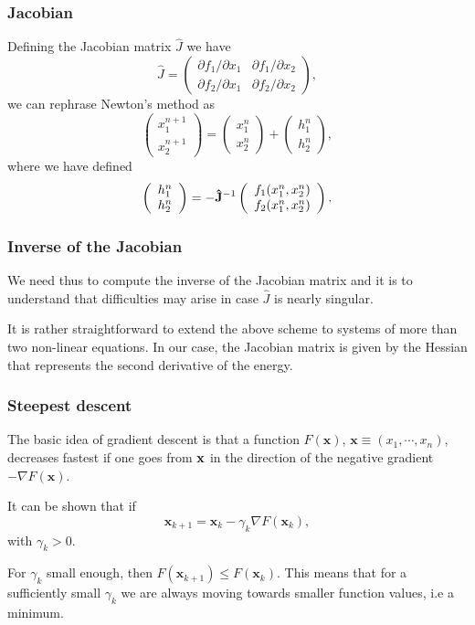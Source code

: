 \documentclass{beamer}
\begin{document}
\begin{frame}
\frametitle{Jacobian}

Defining the Jacobian matrix $\hat{J}$ we have
\[
 \hat{J}=\left( \begin{array}{cc}
                         \partial f_1/\partial x_1  & \partial f_1/\partial x_2 \\
                          \partial f_2/\partial x_1     &\partial f_2/\partial x_2
             \end{array} \right),
\]
we can rephrase Newton's method as
\[
\left(\begin{array}{c} x_1^{n+1} \\ x_2^{n+1} \end{array} \right)=
\left(\begin{array}{c} x_1^{n} \\ x_2^{n} \end{array} \right)+
\left(\begin{array}{c} h_1^{n} \\ h_2^{n} \end{array} \right),
\]
where we have defined
\[
   \left(\begin{array}{c} h_1^{n} \\ h_2^{n} \end{array} \right)=
   -{\bf \hat{J}}^{-1}
   \left(\begin{array}{c} f_1(x_1^{n},x_2^{n}) \\ f_2(x_1^{n},x_2^{n}) \end{array} \right).
\]
\end{frame}

\begin{frame}
\frametitle{Inverse of the Jacobian}

We need thus to compute the inverse of the Jacobian matrix and it
is to understand that difficulties  may
arise in case $\hat{J}$ is nearly singular.

It is rather straightforward to extend the above scheme to systems of
more than two non-linear equations. In our case, the Jacobian matrix is given by the Hessian that represents the second derivative of the energy.
\end{frame}

\begin{frame}
\frametitle{Steepest descent}

The basic idea of gradient descent is
that a function $F(\mathbf{x})$, 
$\mathbf{x} \equiv (x_1,\cdots,x_n)$, decreases fastest if one goes from $\bf {x}$ in the
direction of the negative gradient $-\nabla F(\mathbf{x})$.

It can be shown that if 
\[
\mathbf{x}_{k+1} = \mathbf{x}_k - \gamma_k \nabla F(\mathbf{x}_k),
\]
with $\gamma_k > 0$.

For $\gamma_k$ small enough, then $F(\mathbf{x}_{k+1}) \leq
F(\mathbf{x}_k)$. This means that for a sufficiently small $\gamma_k$
we are always moving towards smaller function values, i.e a minimum.
\end{frame}
\end{document}
